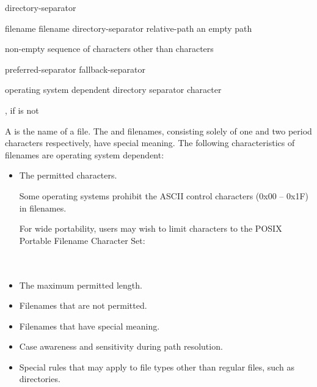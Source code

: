 \begin{ncbnf}
\br
    directory-separator
\end{ncbnf}

\begin{ncbnf}
\br
    filename\br
    filename directory-separator relative-path\br
    \textnormal{an empty path}
\end{ncbnf}

\begin{ncbnf}
\br
    \textnormal{non-empty sequence of characters other than  characters}
\end{ncbnf}

\begin{ncbnf}
\br
    preferred-separator \br
    fallback-separator 
\end{ncbnf}

\begin{ncbnf}
\br
    \textnormal{operating system dependent directory separator character}
\end{ncbnf}

\begin{ncbnf}
\br
    \textnormal{\tcode{/}, if  is not \tcode{/}}
\end{ncbnf}

\pnum
A  is
the name of a file. The  and  filenames,
consisting solely of one and two period characters respectively,
have special meaning.
The following characteristics of filenames are operating system dependent:
\begin{itemize}
\item The permitted characters. \begin{example} Some operating systems prohibit
      the ASCII control characters (0x00 -- 0x1F) in filenames. \end{example}
\begin{note}
For wide portability, users may wish to limit 
characters to the POSIX Portable Filename Character Set: \\
 \\
 \\
\end{note}
\item The maximum permitted length.
\item Filenames that are not permitted.
\item Filenames that have special meaning.
\item Case awareness and sensitivity during path resolution.
\item Special rules that may apply to file types other than regular
  files, such as directories.
\end{itemize}

